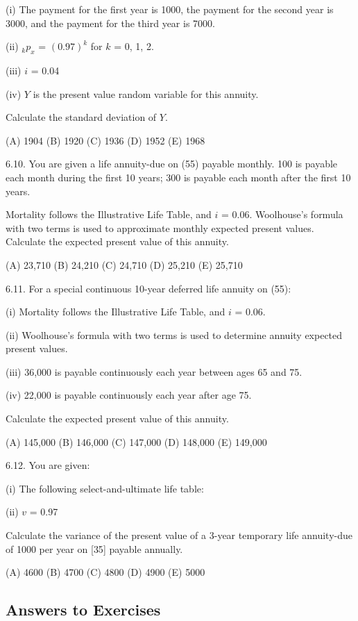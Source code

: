 \documentclass[]{book}
\begin{document}
(i) The payment for the first year is 1000, the payment for the second
year is 3000, and the payment for the third year is 7000.

(ii) \({}_{k}p_x\) = \((0.97)^k\) for \(k\) = 0, 1, 2.

(iii) \(i\) = 0.04

(iv) \(Y\) is the present value random variable for this annuity.

Calculate the standard deviation of \(Y\).

(A) 1904 (B) 1920 (C) 1936 (D) 1952 (E) 1968

6.10. You are given a life annuity-due on (55) payable monthly. 100 is
payable each month during the first 10 years; 300 is payable each month
after the first 10 years.

Mortality follows the Illustrative Life Table, and \(i\) = 0.06.
Woolhouse's formula with two terms is used to approximate monthly
expected present values. Calculate the expected present value of this
annuity.

(A) 23,710 (B) 24,210 (C) 24,710 (D) 25,210 (E) 25,710

6.11. For a special continuous 10-year deferred life annuity on (55):

(i) Mortality follows the Illustrative Life Table, and \(i\) = 0.06.

(ii) Woolhouse's formula with two terms is used to determine annuity
expected present values.

(iii) 36,000 is payable continuously each year between ages 65 and 75.

(iv) 22,000 is payable continuously each year after age 75.

Calculate the expected present value of this annuity.

(A) 145,000 (B) 146,000 (C) 147,000 (D) 148,000 (E) 149,000

6.12. You are given:

(i) The following select-and-ultimate life table:

(ii) \(v\) = 0.97

Calculate the variance of the present value of a 3-year temporary life
annuity-due of 1000 per year on {[}35{]} payable annually.

(A) 4600 (B) 4700 (C) 4800 (D) 4900 (E) 5000

\subsection{Answers to Exercises}\label{answers-to-exercises-3}
\end{document}
